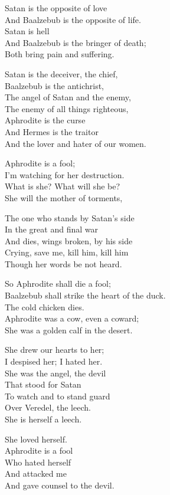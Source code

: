 \documentclass[
]{book}
\begin{document}
Satan is the opposite of love\\
And Baalzebub is the opposite of life.\\
Satan is hell\\
And Baalzebub is the bringer of death;\\
Both bring pain and suffering.

Satan is the deceiver, the chief,\\
Baalzebub is the antichrist,\\
The angel of Satan and the enemy,\\
The enemy of all things righteous,\\
Aphrodite is the curse\\
And Hermes is the traitor\\
And the lover and hater of our women.

Aphrodite is a fool;\\
I'm watching for her destruction.\\
What is she? What will she be?\\
She will the mother of torments,

The one who stands by Satan's side\\
In the great and final war\\
And dies, wings broken, by his side\\
Crying, save me, kill him, kill him\\
Though her words be not heard.

So Aphrodite shall die a fool;\\
Baalzebub shall strike the heart of the duck.\\
The cold chicken dies.\\
Aphrodite was a cow, even a coward;\\
She was a golden calf in the desert.

She drew our hearts to her;\\
I despised her; I hated her.\\
She was the angel, the devil\\
That stood for Satan\\
To watch and to stand guard\\
Over Veredel, the leech.\\
She is herself a leech.

She loved herself.\\
Aphrodite is a fool\\
Who hated herself\\
And attacked me\\
And gave counsel to the devil.
\end{document}
